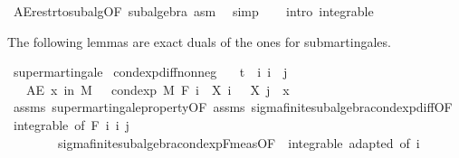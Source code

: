 \begin{isabellebody}
\ AE{\isacharunderscore}{\kern0pt}restr{\isacharunderscore}{\kern0pt}to{\isacharunderscore}{\kern0pt}subalg{\isacharbrackleft}{\kern0pt}OF\ subalgebra{\isacharbrackright}{\kern0pt}\ asm\ \isamarkupfalse%
\ simp\isanewline
\ \ \isacommand{{\isacharbraceright}{\kern0pt}}\isamarkupfalse%
\isanewline
{}\isamarkupfalse%
\ {\isacharparenleft}{\kern0pt}intro\ integrable{\isacharparenright}{\kern0pt}%
\endisatagproof
{\isafoldproof}%
%
\isadelimproof
%
\endisadelimproof
%
\isadelimdocument
%
\endisadelimdocument
%
\isatagdocument
%
\isamarkuptrue%
%
\endisatagdocument
{\isafolddocument}%
%
\isadelimdocument
%
\endisadelimdocument
%
\begin{isamarkuptext}%
The following lemmas are exact duals of the ones for submartingales.%
\end{isamarkuptext}\isamarkuptrue%
\isamarkupfalse%
\ supermartingale\isanewline
{}\isanewline
\isanewline
{}\isamarkupfalse%
\ cond{\isacharunderscore}{\kern0pt}exp{\isacharunderscore}{\kern0pt}diff{\isacharunderscore}{\kern0pt}nonneg{\isacharcolon}{\kern0pt}\isanewline
\ \ \ {\isachardoublequoteopen}t\ {\isasymle}\ i{\isachardoublequoteclose}\ {\isachardoublequoteopen}i\ {\isasymle}\ j{\isachardoublequoteclose}\isanewline
\ \ \ {\isachardoublequoteopen}AE\ x\ in\ M{\isachardot}{\kern0pt}\ {}\ {\isasymle}\ cond{\isacharunderscore}{\kern0pt}exp\ M\ {\isacharparenleft}{\kern0pt}F\ i{\isacharparenright}{\kern0pt}\ {\isacharparenleft}{\kern0pt}{\isasymlambda}{\isasymxi}{\isachardot}{\kern0pt}\ X\ i\ {\isasymxi}\ {\isacharminus}{\kern0pt}\ X\ j\ {\isasymxi}{\isacharparenright}{\kern0pt}\ x{\isachardoublequoteclose}\isanewline
%
\isadelimproof
\ \ %
\endisadelimproof
%
\isatagproof
{}\isamarkupfalse%
\ assms\ supermartingale{\isacharunderscore}{\kern0pt}property{\isacharbrackleft}{\kern0pt}OF\ assms{\isacharbrackright}{\kern0pt}\ sigma{\isacharunderscore}{\kern0pt}finite{\isacharunderscore}{\kern0pt}subalgebra{\isachardot}{\kern0pt}cond{\isacharunderscore}{\kern0pt}exp{\isacharunderscore}{\kern0pt}diff{\isacharbrackleft}{\kern0pt}OF\ {\isacharunderscore}{\kern0pt}\ integrable{\isacharparenleft}{\kern0pt}{}{\isacharcomma}{\kern0pt}{}{\isacharparenright}{\kern0pt}{\isacharcomma}{\kern0pt}\ of\ {\isachardoublequoteopen}F\ i{\isachardoublequoteclose}\ i\ j{\isacharbrackright}{\kern0pt}\ \isanewline
\ \ \ \ \ \ \ \ sigma{\isacharunderscore}{\kern0pt}finite{\isacharunderscore}{\kern0pt}subalgebra{\isachardot}{\kern0pt}cond{\isacharunderscore}{\kern0pt}exp{\isacharunderscore}{\kern0pt}F{\isacharunderscore}{\kern0pt}meas{\isacharbrackleft}{\kern0pt}OF\ {\isacharunderscore}{\kern0pt}\ integrable\ adapted{\isacharcomma}{\kern0pt}\ of\ i{\isacharbrackright}{\kern0pt}\ \isamarkupfalse%

\end{isabellebody}
